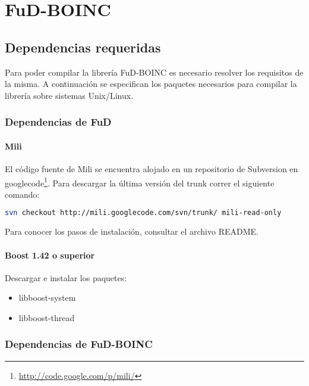 \documentclass[12pt,spanish,a4paper]{report}
\begin{document}
\chapter{FuD-BOINC}


\section{Dependencias requeridas}

Para poder compilar la librería FuD-BOINC es necesario resolver los requisitos de la misma.
A continuación se especifican los paquetes necesarios para compilar la librería sobre sistemas Unix/Linux.\\

\subsection{Dependencias de FuD}

\subsubsection{Mili} 
El código fuente de Mili se encuentra alojado en un repositorio de Subversion en googlecode\footnote{\url{http://code.google.com/p/mili/}}. Para descargar la última versión del trunk correr el siguiente comando:

\begin{lstlisting}[frame=shadowbox, language=bash, basicstyle=\footnotesize, backgroundcolor=\color{gris}]
svn checkout http://mili.googlecode.com/svn/trunk/ mili-read-only
\end{lstlisting}

Para conocer los pasos de instalación, consultar el archivo README.

\subsubsection{Boost 1.42 o superior}

Descargar e instalar los paquetes: 

\begin{itemize}
 \item libboost-system 
 \item libboost-thread
\end{itemize}


\subsection{Dependencias de FuD-BOINC}
\end{document}
